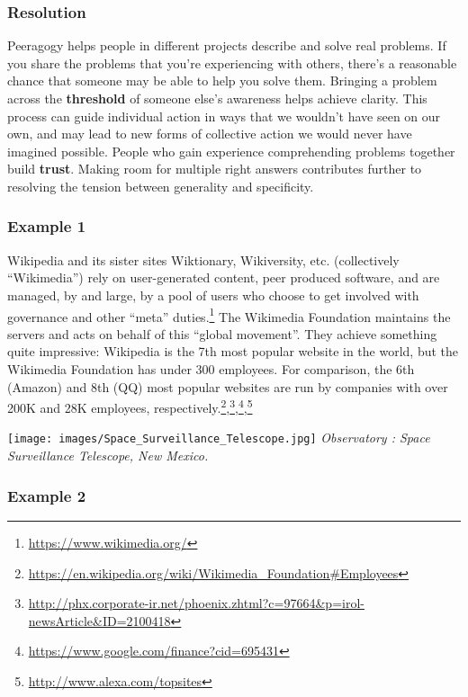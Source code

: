 \hypertarget{resolution}{%
\subsubsection{Resolution}\label{resolution}}

Peeragogy helps people in different projects describe and solve real
problems. If you share the problems that you're experiencing with
others, there's a reasonable chance that someone may be able to help you
solve them. Bringing a problem across the \textbf{threshold} of someone
else's awareness helps achieve clarity. This process can guide
individual action in ways that we wouldn't have seen on our own, and may
lead to new forms of collective action we would never have imagined
possible. People who gain experience comprehending problems together
build \textbf{trust}. Making room for multiple right answers contributes
further to resolving the tension between generality and specificity.

\hypertarget{example-1}{%
\subsubsection{Example 1}\label{example-1}}

Wikipedia and its sister sites Wiktionary, Wikiversity, etc.
(collectively ``Wikimedia'') rely on user-generated content, peer
produced software, and are managed, by and large, by a pool of users who
choose to get involved with governance and other ``meta''
duties.\footnote{\url{https://www.wikimedia.org/}} The Wikimedia
Foundation maintains the servers and acts on behalf of this ``global
movement''. They achieve something quite impressive: Wikipedia is the
7th most popular website in the world, but the Wikimedia Foundation has
under 300 employees. For comparison, the 6th (Amazon) and 8th (QQ) most
popular websites are run by companies with over 200K and 28K employees,
respectively.\footnote{\url{https://en.wikipedia.org/wiki/Wikimedia_Foundation\#Employees}},\footnote{\url{http://phx.corporate-ir.net/phoenix.zhtml?c=97664\&p=irol-newsArticle\&ID=2100418}},\footnote{\url{https://www.google.com/finance?cid=695431}},\footnote{\url{http://www.alexa.com/topsites}}

\texttt{[image: images/Space\_Surveillance\_Telescope.jpg]}
\emph{Observatory : Space Surveillance Telescope, New Mexico.}

\hypertarget{example-2}{%
\subsubsection{Example 2}\label{example-2}}

